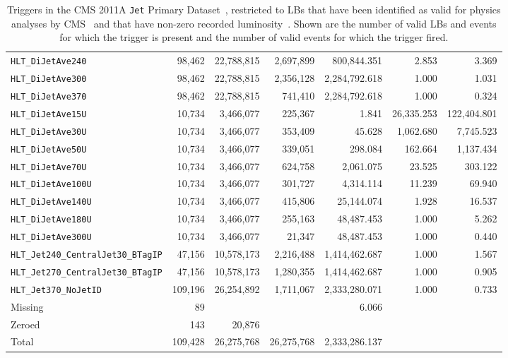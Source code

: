 \documentclass[aps,prd,twocolumn,preprintnumbers,nofootinbib,longbibliography,floatfix,superscriptaddress]{revtex4-1}
\begin{document}
\begin{table*}[t]
\begin{center}
\begin{tabular}{ l @{$\quad$}  r @{$\quad$} r @{$\quad$} r @{$\quad$} r @{$\quad$} r @{$\quad$} r @{$\quad$} }
\texttt{HLT\_DiJetAve240} & 98,462 & 22,788,815 & 2,697,899 & 800,844.351 & 2.853 & 3.369 \\
\texttt{HLT\_DiJetAve300} & 98,462 & 22,788,815 & 2,356,128 & 2,284,792.618 & 1.000 & 1.031 \\
\texttt{HLT\_DiJetAve370} & 98,462 & 22,788,815 & 741,410 & 2,284,792.618 & 1.000 & 0.324 \\
\hline
\texttt{HLT\_DiJetAve15U} & 10,734 & 3,466,077 & 225,367 & 1.841 & 26,335.253 & 122,404.801 \\
\texttt{HLT\_DiJetAve30U} & 10,734 & 3,466,077 & 353,409 & 45.628 & 1,062.680 & 7,745.523 \\
\texttt{HLT\_DiJetAve50U} & 10,734 & 3,466,077 & 339,051 & 298.084 & 162.664 & 1,137.434 \\
\texttt{HLT\_DiJetAve70U} & 10,734 & 3,466,077 & 624,758 & 2,061.075 & 23.525 & 303.122 \\
\texttt{HLT\_DiJetAve100U} & 10,734 & 3,466,077 & 301,727 & 4,314.114 & 11.239 & 69.940 \\
\texttt{HLT\_DiJetAve140U} & 10,734 & 3,466,077 & 415,806 & 25,144.074 & 1.928 & 16.537 \\
\texttt{HLT\_DiJetAve180U} & 10,734 & 3,466,077 & 255,163 & 48,487.453 & 1.000 & 5.262 \\
\texttt{HLT\_DiJetAve300U} & 10,734 & 3,466,077 & 21,347 & 48,487.453 & 1.000 & 0.440 \\
\hline
\texttt{HLT\_Jet240\_CentralJet30\_BTagIP} & 47,156 & 10,578,173 & 2,216,488 & 1,414,462.687 & 1.000 & 1.567 \\
\texttt{HLT\_Jet270\_CentralJet30\_BTagIP} & 47,156 & 10,578,173 & 1,280,355 & 1,414,462.687 & 1.000 & 0.905 \\
\texttt{HLT\_Jet370\_NoJetID} & 109,196 & 26,254,892 & 1,711,067 & 2,333,280.071 & 1.000 & 0.733 \\
\hline
\hline
Missing & 89 & &  & 6.066 &  &  \\
Zeroed & 143 & 20,876 &  & &  &  \\
Total & 109,428 & 26,275,768 & 26,275,768 & 2,333,286.137 &  &  \\
\hline
\hline
\end{tabular}
\caption{Triggers in the CMS 2011A \texttt{Jet} Primary Dataset~\cite{CMS:JetPrimary2011A}, restricted to LBs that have been identified as valid for physics analyses by CMS~\cite{CMS:ValidatedRuns2011A} and that have non-zero recorded luminosity~\cite{CMS:luminosity2011}.
%
Shown are the number of valid LBs and events for which the trigger is present and the number of valid events for which the trigger fired.
}
\end{center}
\end{table*}
\end{document}
